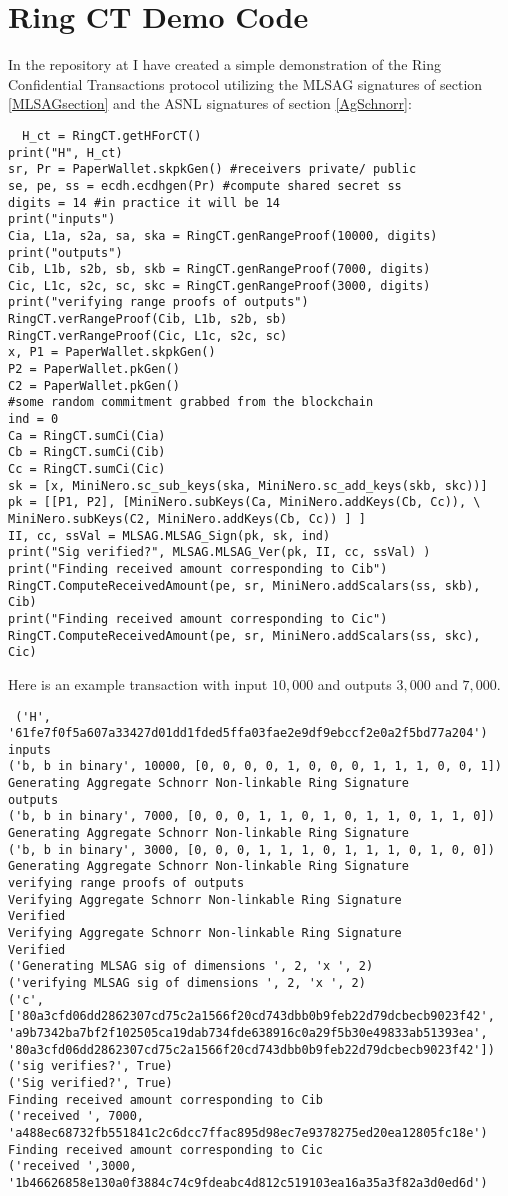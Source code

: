 \documentclass[12pt,oneside,english]{amsart}
\numberwithin{equation}{section}
\numberwithin{figure}{section}
\theoremstyle{plain}
\theoremstyle{plain}
\theoremstyle{remark}
\theoremstyle{plain}
\theoremstyle{remark}
\theoremstyle{remark}
\theoremstyle{plain}
\theoremstyle{definition}
\begin{document}
\section{Ring CT Demo Code}
In the repository at \cite{Snoe} I have created a simple demonstration of the Ring Confidential Transactions protocol utilizing the MLSAG signatures of section \ref{MLSAGsection} and the ASNL signatures of section \ref{AgSchnorr}:
\begin{verbatim}
  H_ct = RingCT.getHForCT()
print("H", H_ct)
sr, Pr = PaperWallet.skpkGen() #receivers private/ public
se, pe, ss = ecdh.ecdhgen(Pr) #compute shared secret ss
digits = 14 #in practice it will be 14
print("inputs")
Cia, L1a, s2a, sa, ska = RingCT.genRangeProof(10000, digits)
print("outputs")
Cib, L1b, s2b, sb, skb = RingCT.genRangeProof(7000, digits)
Cic, L1c, s2c, sc, skc = RingCT.genRangeProof(3000, digits)
print("verifying range proofs of outputs")
RingCT.verRangeProof(Cib, L1b, s2b, sb)
RingCT.verRangeProof(Cic, L1c, s2c, sc)
x, P1 = PaperWallet.skpkGen()
P2 = PaperWallet.pkGen()
C2 = PaperWallet.pkGen() 
#some random commitment grabbed from the blockchain
ind = 0
Ca = RingCT.sumCi(Cia)
Cb = RingCT.sumCi(Cib)
Cc = RingCT.sumCi(Cic)
sk = [x, MiniNero.sc_sub_keys(ska, MiniNero.sc_add_keys(skb, skc))]
pk = [[P1, P2], [MiniNero.subKeys(Ca, MiniNero.addKeys(Cb, Cc)), \
MiniNero.subKeys(C2, MiniNero.addKeys(Cb, Cc)) ] ]
II, cc, ssVal = MLSAG.MLSAG_Sign(pk, sk, ind)
print("Sig verified?", MLSAG.MLSAG_Ver(pk, II, cc, ssVal) )
print("Finding received amount corresponding to Cib")
RingCT.ComputeReceivedAmount(pe, sr, MiniNero.addScalars(ss, skb), Cib)
print("Finding received amount corresponding to Cic")
RingCT.ComputeReceivedAmount(pe, sr, MiniNero.addScalars(ss, skc), Cic)

\end{verbatim} 
Here is an example transaction with input $10,000$ and outputs $3,000$ and $7,000$. 
\begin{verbatim}
 ('H', '61fe7f0f5a607a33427d01dd1fded5ffa03fae2e9df9ebccf2e0a2f5bd77a204')
inputs
('b, b in binary', 10000, [0, 0, 0, 0, 1, 0, 0, 0, 1, 1, 1, 0, 0, 1])
Generating Aggregate Schnorr Non-linkable Ring Signature
outputs
('b, b in binary', 7000, [0, 0, 0, 1, 1, 0, 1, 0, 1, 1, 0, 1, 1, 0])
Generating Aggregate Schnorr Non-linkable Ring Signature
('b, b in binary', 3000, [0, 0, 0, 1, 1, 1, 0, 1, 1, 1, 0, 1, 0, 0])
Generating Aggregate Schnorr Non-linkable Ring Signature
verifying range proofs of outputs
Verifying Aggregate Schnorr Non-linkable Ring Signature
Verified
Verifying Aggregate Schnorr Non-linkable Ring Signature
Verified
('Generating MLSAG sig of dimensions ', 2, 'x ', 2)
('verifying MLSAG sig of dimensions ', 2, 'x ', 2)
('c', 
['80a3cfd06dd2862307cd75c2a1566f20cd743dbb0b9feb22d79dcbecb9023f42',
'a9b7342ba7bf2f102505ca19dab734fde638916c0a29f5b30e49833ab51393ea',
'80a3cfd06dd2862307cd75c2a1566f20cd743dbb0b9feb22d79dcbecb9023f42'])
('sig verifies?', True)
('Sig verified?', True)
Finding received amount corresponding to Cib
('received ', 7000,
'a488ec68732fb551841c2c6dcc7ffac895d98ec7e9378275ed20ea12805fc18e')
Finding received amount corresponding to Cic
('received ',3000,
'1b46626858e130a0f3884c74c9fdeabc4d812c519103ea16a35a3f82a3d0ed6d')
\end{verbatim}
\end{document}
